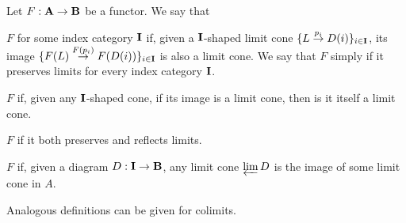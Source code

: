 \begin{definition}\label{def:categorical_limit_preservation}\cite[definitions 5.3.1, 5.3.5]{Leinster2014}
  Let \( F: \operatorname{\mathbf{A}} \to \operatorname{\mathbf{B}} \) be a functor. We say that
  \begin{defenum}
    \item\label{def:categorical_limit_preservation/preserve} \( F \)  for some index category \( \operatorname{\mathbf{I}} \) if, given a \( \operatorname{\mathbf{I}} \)-shaped limit cone \mbox{\( \{ L \overset {p_i} \to D(i) \}_{i \in \operatorname{\mathbf{I}}} \)}, its image \mbox{\( \{ F(L) \overset {F(p_i)} \to F(D(i)) \}_{i \in \operatorname{\mathbf{I}}} \)} is also a limit cone. We say that \( F \) simply  if it preserves limits for every index category \( \operatorname{\mathbf{I}} \).

    \item\label{def:categorical_limit_preservation/reflect} \( F \)  if, given any \( \operatorname{\mathbf{I}} \)-shaped cone, if its image is a limit cone, then is it itself a limit cone.

    \item\label{def:categorical_limit_preservation/create} \( F \)  if it both preserves and reflects limits.

    \item\label{def:categorical_limit_preservation/lift} \( F \)  if, given a diagram \( D: \operatorname{\mathbf{I}} \to \operatorname{\mathbf{B}} \), any limit cone \( \varprojlim D \) is the image of some limit cone in \( A \).
  \end{defenum}
\end{definition}

\begin{note}\label{note:categorical_colimit_preservation}
  Analogous definitions can be given for colimits.
\end{note}
